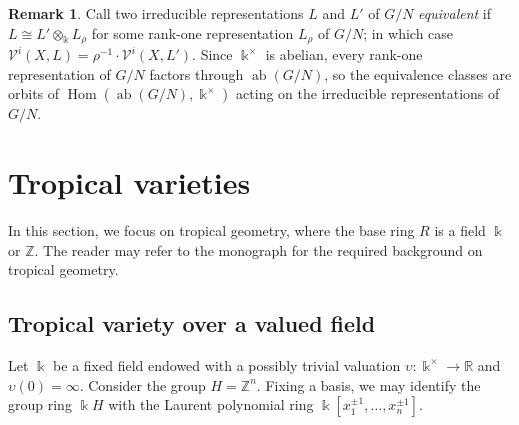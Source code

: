 \documentclass[11pt]{amsart}
\theoremstyle{definition}
\newtheorem{remark}[theorem]{Remark}
\newcommand{\Z}{\mathbb{Z}}
\newcommand{\R}{\mathbb{R}}
\renewcommand{\k}{\Bbbk}
\newcommand{\VV}{\mathcal{V}}
\DeclareMathOperator{\ab}{{ab}}
\DeclareMathOperator{\Hom}{{Hom}}
\begin{document}
\begin{remark}
\label{rem:equivalence}
Call two irreducible representations $L$ and $L'$ of $G/N$ 
\emph{equivalent} if $L \cong L' \otimes_\k L_\rho$ for some 
rank-one representation $L_\rho$ of $G/N$; in which case
$\VV^i(X,L) = \rho^{-1}\cdot\VV^i(X,L')$.
Since $\k^\times$ is abelian, every rank-one representation of 
$G/N$ factors through $\ab(G/N)$, so the equivalence classes 
are orbits of $\Hom(\ab(G/N),\k^\times)$ acting on the 
irreducible representations of $G/N$.
\end{remark}

\section{Tropical varieties}
\label{sect:tropical}
In this section, we focus on tropical geometry, where the base ring $R$ 
is a field $\k$ or $\Z$. The reader may refer to the monograph \cite{MacStu} 
for the required background on tropical geometry.

\subsection{Tropical variety over a valued field}
\label{subsec:trop-valued-field}
Let $\k$ be a fixed field endowed with a possibly trivial valuation 
$\upsilon\colon\k^\times\to \R$ and $\upsilon(0)=\infty$. 
Consider the group $H=\Z^n$. Fixing a basis, we may identify 
the group ring $\k H$ with the Laurent polynomial ring 
$\k[x_1^{{\pm 1} },\ldots,x_n^{{\pm 1} }]$.
\end{document}
